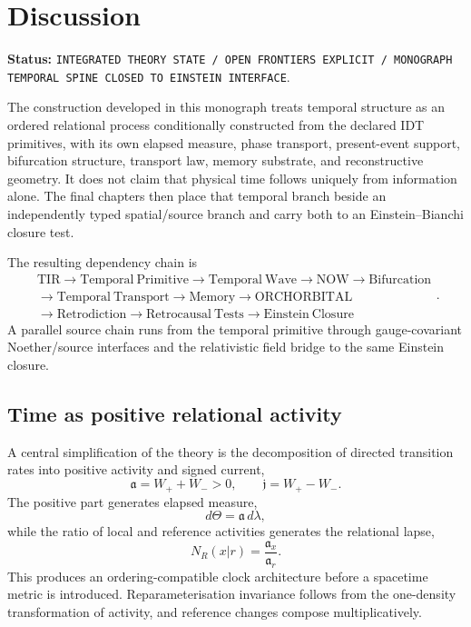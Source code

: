 \chapter{Discussion}

\noindent\textbf{Status:} \texttt{INTEGRATED THEORY STATE / OPEN FRONTIERS EXPLICIT / MONOGRAPH TEMPORAL SPINE CLOSED TO EINSTEIN INTERFACE}.

The construction developed in this monograph treats temporal structure as an ordered relational process conditionally constructed from the declared IDT primitives, with its own elapsed measure, phase transport, present-event support, bifurcation structure, transport law, memory substrate, and reconstructive geometry. It does not claim that physical time follows uniquely from information alone. The final chapters then place that temporal branch beside an independently typed spatial/source branch and carry both to an Einstein--Bianchi closure test.

The resulting dependency chain is
\[
\boxed{
\begin{gathered}
\mathrm{TIR}
\rightarrow
\mathrm{Temporal\ Primitive}
\rightarrow
\mathrm{Temporal\ Wave}
\rightarrow
\mathrm{NOW}
\rightarrow
\mathrm{Bifurcation}
\\
{}\rightarrow
\mathrm{Temporal\ Transport}
\rightarrow
\mathrm{Memory}
\rightarrow
\mathrm{ORCHORBITAL}
\\
{}\rightarrow
\mathrm{Retrodiction}
\rightarrow
\mathrm{Retrocausal\ Tests}
\rightarrow
\mathrm{Einstein\ Closure}
\end{gathered}
}.
\]
A parallel source chain runs from the temporal primitive through gauge-covariant Noether/source interfaces and the relativistic field bridge to the same Einstein closure.

\section{Time as positive relational activity}

A central simplification of the theory is the decomposition of directed transition rates into positive activity and signed current,
\[
\mathfrak a=W_++W_->0,
\qquad
\mathfrak j=W_+-W_-.
\]
The positive part generates elapsed measure,
\[
d\Theta=\mathfrak a\,d\lambda,
\]
while the ratio of local and reference activities generates the relational lapse,
\[
N_R(x|r)=\frac{\mathfrak a_x}{\mathfrak a_r}.
\]
This produces an ordering-compatible clock architecture before a spacetime metric is introduced. Reparameterisation invariance follows from the one-density transformation of activity, and reference changes compose multiplicatively.

